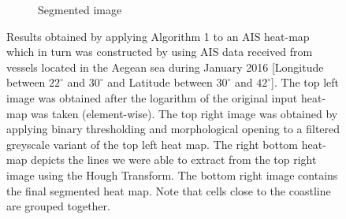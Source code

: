 \documentclass{article}
\begin{document}
\begin{figure}[h]
\begin{subfigure}[b]{0.49\linewidth}
    \caption{Segmented image} 
    \label{fig7:d} 
  \end{subfigure} 
  \caption{Results obtained by applying Algorithm 1 to an AIS heat-map which in turn was constructed by using AIS data received from vessels located in the Aegean sea during January 2016 [Longitude between $22^{\circ}$ and $30^{\circ}$ and Latitude between $30^{\circ}$ and $42^{\circ}$]. The top left image was obtained after the logarithm of the original input heat-map was taken (element-wise). The top right image 
  was obtained by applying binary thresholding and morphological opening to a filtered greyscale variant of the top left heat map. The right bottom heat-map depicts the lines we were able to extract 
  from the top right image using the Hough Transform. The bottom right image contains the final segmented heat map. Note that cells close to the coastline are grouped together.}
  \label{fig7} 
\end{figure}
\end{document}
